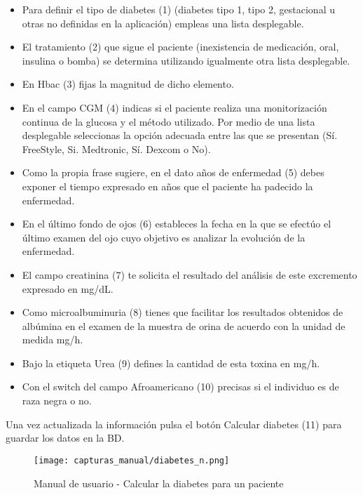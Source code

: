 \documentclass[11pt,spanish,
		listoftables,listoffigures]
		{tfgplantilla}
\begin{document}
\begin{itemize}
	\item Para definir el tipo de diabetes (1) (diabetes tipo 1, tipo 2, gestacional u otras no definidas en la aplicación) empleas una lista desplegable.

	\item El tratamiento (2) que sigue el paciente (inexistencia de medicación, oral, insulina o bomba) se determina utilizando igualmente otra lista desplegable.

	\item En Hbac (3) fijas la magnitud de dicho elemento.

	\item En el campo CGM (4) indicas si el paciente realiza una monitorización continua de la glucosa y el método utilizado. Por medio de una lista desplegable seleccionas la opción adecuada entre las que se presentan (Sí. FreeStyle, Si. Medtronic, Sí. Dexcom o No).

	\item Como la propia frase sugiere, en el dato años de enfermedad (5) debes exponer el tiempo expresado en años que el paciente ha padecido la enfermedad.

	\item En el último fondo de ojos (6) estableces la fecha en la que se efectúo el último examen del ojo cuyo objetivo es analizar la evolución de la enfermedad.

	\item El campo creatinina (7) te solicita el resultado del análisis de este excremento expresado en mg/dL.

	\item Como microalbuminuria (8) tienes que facilitar los resultados obtenidos de albúmina en el examen de la muestra de orina de acuerdo con la unidad de medida mg/h.

	\item Bajo la etiqueta Urea (9) defines la cantidad de esta toxina en mg/h.

	\item Con el switch del campo Afroamericano (10) precisas si el individuo es de raza negra o no.
\end{itemize}

Una vez actualizada la información pulsa el botón \textquotedbl Calcular diabetes\textquotedbl{} (11) para guardar los datos en la BD.

\begin{figure}[H]
\centering
\texttt{[image: capturas\_manual/diabetes\_n.png]}
\caption{Manual de usuario - Calcular la diabetes para un paciente}
\end{figure}
\end{document}
